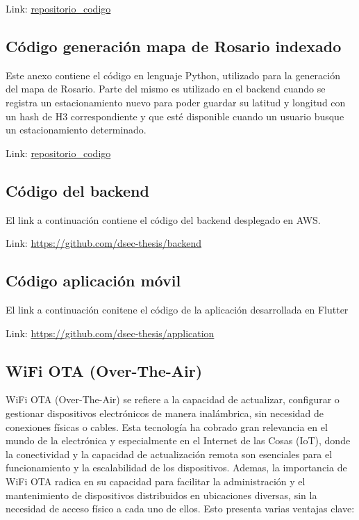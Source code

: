 \begin{appendixd}
            Link: \url{repositorio_codigo}


        \subsection{Código generación mapa de Rosario indexado}
            Este anexo contiene el código en lenguaje Python, utilizado para la generación del mapa de Rosario. 
            Parte del mismo es utilizado en el backend cuando se registra un estacionamiento nuevo para poder guardar su latitud y 
            longitud con un hash de H3 correspondiente y que esté disponible cuando un usuario busque un estacionamiento determinado.

            Link: \url{repositorio_codigo}

        \subsection{Código del backend}
            El link a continuación contiene el código del backend desplegado en AWS.

            Link: \url{https://github.com/dsec-thesis/backend}

        \subsection{Código aplicación móvil}
            El link a continuación conitene el código de la aplicación desarrollada en Flutter

            Link: \url{https://github.com/dsec-thesis/application}

        \subsection{WiFi OTA (Over-The-Air)}{\label{configuracion_wifi}}
            WiFi OTA (Over-The-Air) se refiere a la capacidad de actualizar, configurar o gestionar dispositivos electrónicos de manera inalámbrica, 
            sin necesidad de conexiones físicas o cables. Esta tecnología ha cobrado gran relevancia en el mundo de la electrónica y 
            especialmente en el Internet de las Cosas (IoT), donde la conectividad y la capacidad de actualización remota son 
            esenciales para el funcionamiento y la escalabilidad de los dispositivos. Ademas, la importancia de WiFi OTA radica 
            en su capacidad para facilitar la administración y el mantenimiento de dispositivos distribuidos en ubicaciones diversas,
            sin la necesidad de acceso físico a cada uno de ellos. Esto presenta varias ventajas clave:


\end{appendixd}
